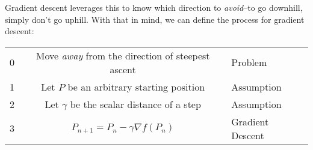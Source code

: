 \documentclass[11pt, a4paper]{article}
\begin{document}
Gradient descent leverages this to know which direction to \textit{avoid}--to go downhill, simply don't go uphill. With that in mind,
we can define the process for gradient descent:

\begin{center}
    \begin{tabular}{l | c | l}
        0 & Move \textit{away} from the direction of steepest ascent & Problem\\
        1 & Let $P$ be an arbitrary starting position & Assumption\\
        2 & Let $\gamma$ be the scalar distance of a step & Assumption\\
        3 & $P_{n+1} = P_n - \gamma \nabla f(P_n)$ & Gradient Descent \\
    \end{tabular}
\end{center}
\end{document}
